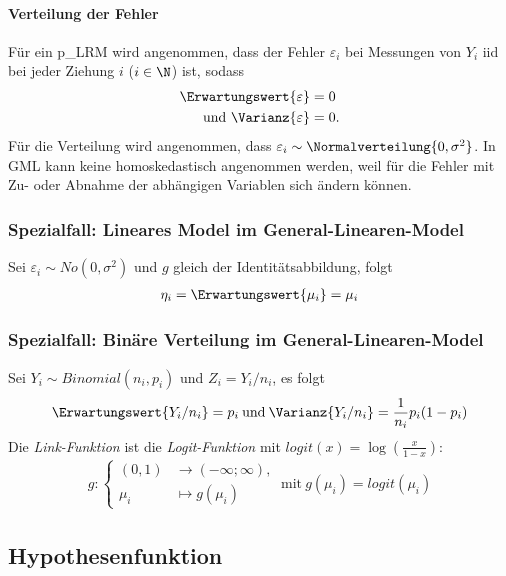 \paragraph{Verteilung der Fehler}
Für ein \gls{p_LRM} wird angenommen, dass der Fehler $\varepsilon_i$ bei Messungen von $Y_i$ \gls{iid} bei jeder Ziehung $i$ ($i\in \N$) ist, sodass
\begin{align}
	\Erwartungswert{\varepsilon} &= 0 \\ 
	\text{und } \Varianz{\varepsilon} & =0.
\end{align}
Für die Verteilung wird angenommen, dass $\varepsilon_i\sim \Normalverteilung{0, \sigma^2}$. In \gls{GML} kann keine homoskedastisch angenommen werden, weil für die Fehler mit Zu- oder Abnahme der abhängigen Variablen sich ändern können.

\subsubsection{Spezialfall: Lineares Model im General-Linearen-Model}
Sei $\varepsilon_i\sim No(0, \sigma^2)$ und $g$ gleich der Identitätsabbildung, folgt
\begin{align}
	\eta_i = \Erwartungswert{\mu_i} = \mu_i	
\end{align}

\subsubsection{Spezialfall: Binäre Verteilung im General-Linearen-Model} \label{sec: Spezialfall: Binäres Verteilung}
Sei $Y_i \sim Binomial(n_i, p_i)$ und $Z_i = Y_i/n_i$, es folgt
\begin{align} 
	\Erwartungswert{Y_i/n_i} = p_i \:\text{und}\: \Varianz{Y_i/n_i}= \frac{1}{n_i} p_i (1- p_i)  
\end{align}
Die \textit{Link-Funktion} ist die \textit{Logit-Funktion} mit $logit(x)= \log\left(\frac{x}{1-x}\right)$: 
\begin{align}
	g:\begin{cases}
		(0,1) & \rightarrow  (-\infty; \infty),\\
		\mu_i  & \mapsto g(\mu_i)
	\end{cases}\:\text{mit}\:g(\mu_i)= logit(\mu_i)
\end{align}

\subsection{Hypothesenfunktion}
